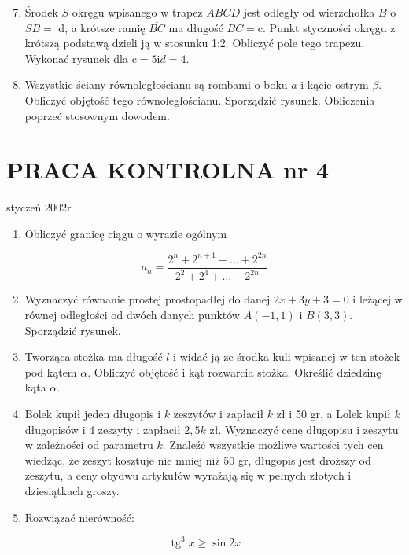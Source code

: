 \documentclass[10pt]{article}
\begin{document}
\begin{enumerate}
  \setcounter{enumi}{6}
  \item Środek $S$ okręgu wpisanego w trapez $A B C D$ jest odległy od wierzchołka $B$ o $S B=$ d, a krótsze ramię $\overline{B C}$ ma długość $B C=\mathrm{c}$. Punkt styczności okręgu z krótszą podstawą dzieli ją w stosunku 1:2. Obliczyć pole tego trapezu. Wykonać rysunek dla $\mathrm{c}=5 \mathrm{i} d=4$.
  \item Wszystkie ściany równoległościanu są rombami o boku $a$ i kącie ostrym $\beta$. Obliczyć objętość tego równoległościanu. Sporządzić rysunek. Obliczenia poprzeć stosownym dowodem.
\end{enumerate}

\section*{PRACA KONTROLNA nr 4}
styczeń 2002r

\begin{enumerate}
  \item Obliczyć granicę ciągu o wyrazie ogólnym
\end{enumerate}

$$
a_{n}=\frac{2^{n}+2^{n+1}+\ldots+2^{2 n}}{2^{2}+2^{4}+\ldots+2^{2 n}}
$$

\begin{enumerate}
  \setcounter{enumi}{1}
  \item Wyznaczyć równanie prostej prostopadłej do danej $2 x+3 y+3=0$ i leżącej w równej odległości od dwóch danych punktów $A(-1,1)$ i $B(3,3)$. Sporządzić rysunek.
  \item Tworząca stożka ma długość $l$ i widać ją ze środka kuli wpisanej w ten stożek pod kątem $\alpha$. Obliczyć objętość i kąt rozwarcia stożka. Określić dziedzinę kąta $\alpha$.
  \item Bolek kupił jeden długopis i $k$ zeszytów i zapłacił $k$ zł i 50 gr, a Lolek kupił $k$ długopisów i 4 zeszyty i zapłacił $2,5 k$ zł. Wyznaczyć cenę długopisu i zeszytu w zależności od parametru $k$. Znaleźć wszystkie możliwe wartości tych cen wiedząc, że zeszyt kosztuje nie mniej niż 50 gr, długopis jest droższy od zeszytu, a ceny obydwu artykułów wyrażają się w pełnych złotych i dziesiątkach groszy.
  \item Rozwiązać nierówność:
\end{enumerate}

$$
\operatorname{tg}^{3} x \geqslant \sin 2 x
$$
\end{document}
